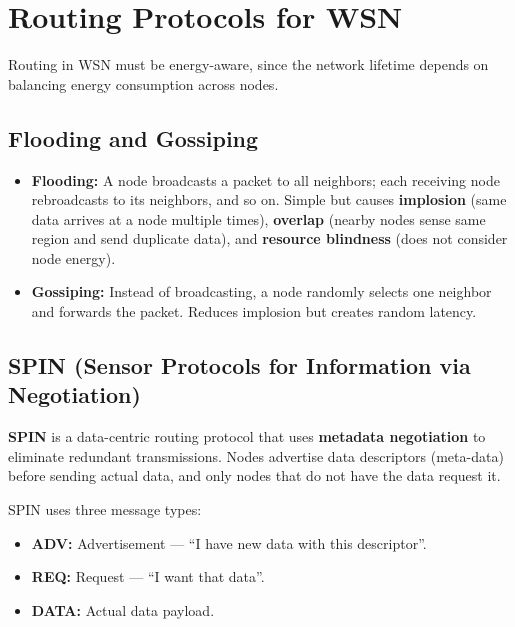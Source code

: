 \documentclass[12pt,a4paper]{article}
\begin{document}
\section{Routing Protocols for WSN}

Routing in WSN must be energy-aware, since the network lifetime depends on balancing energy consumption across nodes.

\subsection{Flooding and Gossiping}

\begin{itemize}[leftmargin=*, itemsep=3pt]
  \item \textbf{Flooding:} A node broadcasts a packet to all neighbors; each receiving node rebroadcasts to its neighbors, and so on. Simple but causes \textbf{implosion} (same data arrives at a node multiple times), \textbf{overlap} (nearby nodes sense same region and send duplicate data), and \textbf{resource blindness} (does not consider node energy).
  \item \textbf{Gossiping:} Instead of broadcasting, a node randomly selects one neighbor and forwards the packet. Reduces implosion but creates random latency.
\end{itemize}

\subsection{SPIN (Sensor Protocols for Information via Negotiation)}

\begin{tcolorbox}[defbox, title={\textbf{SPIN --- Definition}}]
\textbf{SPIN} is a data-centric routing protocol that uses \textbf{metadata negotiation} to eliminate redundant transmissions. Nodes advertise data descriptors (meta-data) before sending actual data, and only nodes that do not have the data request it.
\end{tcolorbox}

SPIN uses three message types:
\begin{itemize}[leftmargin=*, itemsep=2pt]
  \item \textbf{ADV:} Advertisement --- ``I have new data with this descriptor''.
  \item \textbf{REQ:} Request --- ``I want that data''.
  \item \textbf{DATA:} Actual data payload.
\end{itemize}
\end{document}
